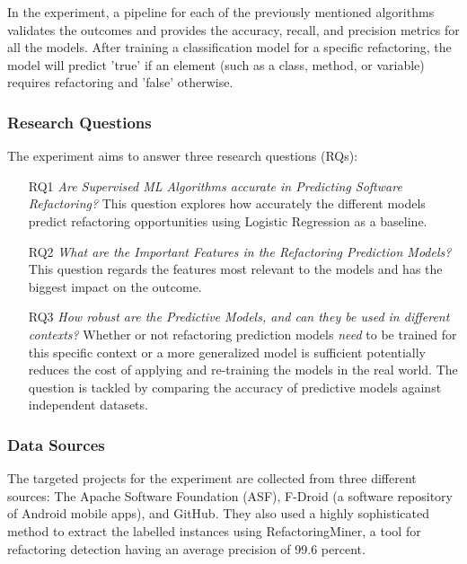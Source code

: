 In the experiment, a pipeline for each of the previously mentioned algorithms validates the outcomes and provides the accuracy, recall, and precision metrics for all the models. After training a classification model for a specific refactoring, the model will predict 'true' if an element (such as a class, method, or variable) requires refactoring and 'false' otherwise.
\subsubsection{Research Questions}
The experiment aims to answer three research questions (RQs):
\begin{itemize}
    \item[RQ1] \textit{Are Supervised ML Algorithms accurate in Predicting Software Refactoring?} This question explores how accurately the different models predict refactoring opportunities using Logistic Regression as a baseline.
    \item[RQ2] \textit{What are the Important Features in the Refactoring Prediction Models?} This question regards the features most relevant to the models and has the biggest impact on the outcome.
    \item[RQ3] \textit{How robust are the Predictive Models, and can they be used in different contexts?} Whether or not refactoring prediction models \textit{need} to be trained for this specific context or a more generalized model is sufficient potentially reduces the cost of applying and re-training the models in the real world. The question is tackled by comparing the accuracy of predictive models against independent datasets.
\end{itemize}
\subsubsection{Data Sources}
The targeted projects for the experiment are collected from three different sources: The Apache Software Foundation (ASF), F-Droid (a software repository of Android mobile apps), and GitHub. They also used a highly sophisticated method to extract the labelled instances using RefactoringMiner\cite{tsantalis2018accurate}, a tool for refactoring detection having an average precision of 99.6 percent\cite{tsantalis2022refactoringminer}.
